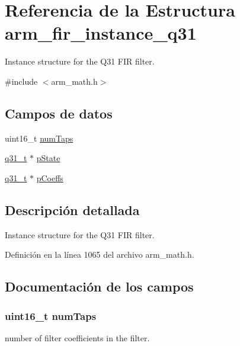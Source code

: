 \hypertarget{structarm__fir__instance__q31}{}\section{Referencia de la Estructura arm\+\_\+fir\+\_\+instance\+\_\+q31}
\label{structarm__fir__instance__q31}


Instance structure for the Q31 F\+IR filter.  




{\ttfamily \#include $<$arm\+\_\+math.\+h$>$}

\subsection*{Campos de datos}
\begin{DoxyCompactItemize}
\item 
uint16\+\_\+t \hyperlink{structarm__fir__instance__q31_a751941891e47f522a7f5375fe8990aac}{num\+Taps}
\item 
\hyperlink{arm__math_8h_adc89a3547f5324b7b3b95adec3806bc0}{q31\+\_\+t} $\ast$ \hyperlink{structarm__fir__instance__q31_adee4ba3ee8869865af7d8fa08ca913d6}{p\+State}
\item 
\hyperlink{arm__math_8h_adc89a3547f5324b7b3b95adec3806bc0}{q31\+\_\+t} $\ast$ \hyperlink{structarm__fir__instance__q31_a68888e36167d81cb7836db10367a1682}{p\+Coeffs}
\end{DoxyCompactItemize}


\subsection{Descripción detallada}
Instance structure for the Q31 F\+IR filter. 

Definición en la línea 1065 del archivo arm\+\_\+math.\+h.



\subsection{Documentación de los campos}
\subsubsection[{\texorpdfstring{num\+Taps}{numTaps}}]{\setlength{\rightskip}{0pt plus 5cm}uint16\+\_\+t num\+Taps}\hypertarget{structarm__fir__instance__q31_a751941891e47f522a7f5375fe8990aac}{}\label{structarm__fir__instance__q31_a751941891e47f522a7f5375fe8990aac}
number of filter coefficients in the filter. 

